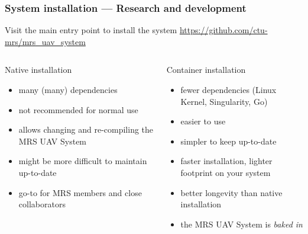 \documentclass[aspectratio=169]{beamer}
\begin{document}


\begin{frame}
\frametitle{System installation --- Research and development}

  \begin{block}{Visit the main entry point to install the system}
    \centering
    \Large\url{https://github.com/ctu-mrs/mrs_uav_system}
  \end{block}

  \begin{columns}[c]

  \begin{block}{{\color{red} Native installation}}
    \begin{itemize}
      \item many (many) dependencies
      \item not recommended for normal use
      \item allows changing and re-compiling the MRS UAV System
      \item might be more difficult to maintain up-to-date
      \item go-to for MRS members and close collaborators
    \end{itemize}
  \end{block}

  \begin{block}{{\color{blue} Container installation}}
    \begin{itemize}
      \item fewer dependencies (Linux Kernel, Singularity, Go)
      \item easier to use
      \item simpler to keep up-to-date
      \item faster installation, lighter footprint on your system
      \item better longevity than native installation
      \item {\color{red} the MRS UAV System is \emph{baked in}}
    \end{itemize}
  \end{block}

  \end{columns}

\end{frame}

\end{document}
